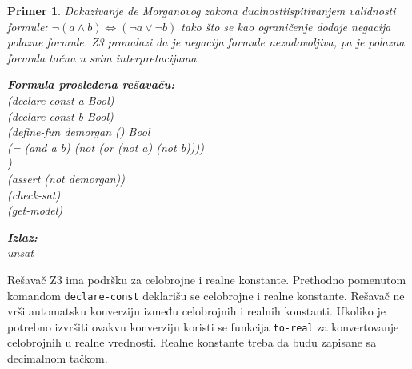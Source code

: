\documentclass[12pt,oneside]{memoir}
\newcommand\tab[1][0.5cm]{\hspace*{#1}}
\newtheorem{primer}{Primer}
\begin{document}
\begin{primer} Dokazivanje de Morganovog zakona dualnosti\label{primer:demorgan} ispitivanjem validnosti formule: $\neg{(a \land b)} \Leftrightarrow (\neg{a} \lor \neg{b}) $ tako što se kao ograničenje dodaje negacija polazne formule. Z3 pronalazi da je negacija formule nezadovoljiva, pa je polazna formula tačna u svim interpretacijama. \\

\hspace{-0.6cm}
\begin{minipage}[b]{0.5\textwidth}
\textbf{Formula prosleđena rešavaču:}
\\(declare-const a Bool)
\\(declare-const b Bool)
\\(define-fun demorgan () Bool
\\\tab (= (and a b) (not (or (not a) (not b))))
\\)
\\(assert (not demorgan))
\\(check-sat) 
\\(get-model)
\end{minipage}
\hspace{1.5cm}
\begin{minipage}[t]{0.4\textwidth}
\vspace{-5.35cm}
\textbf{Izlaz:}
\\unsat
\end{minipage}
\end{primer}

Rešavač Z3 ima podršku za celobrojne i realne konstante. Prethodno pomenutom komandom \texttt{declare-const} deklarišu se celobrojne i realne konstante. Rešavač ne vrši automatsku konverziju između celobrojnih i realnih konstanti. Ukoliko je potrebno izvršiti ovakvu konverziju koristi se funkcija \texttt{to-real} za konvertovanje celobrojnih u realne vrednosti.
Realne konstante treba da budu zapisane sa decimalnom tačkom.
\end{document}
